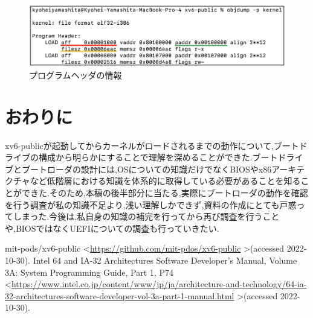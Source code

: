 \documentclass[submit,techreq,noauthor]{eco}	%
\begin{document}
\begin{figure}[H]
    \centering
    \includegraphics[scale=0.4]{fig/pic9.eps}
    \caption{プログラムヘッダの情報}
    \label{sample}
\end{figure}

\section{おわりに}
xv6-publicが起動してからカーネルがロードされるまでの動作について,ブートドライブの構成から明らかにすることで理解を深めることができた.ブートドライブとブートローダの設計には,OSについての知識だけでなくBIOSやx86アーキテクチャなど低階層における知識を体系的に取得している必要があることを知ることができた.そのため,本稿の後半部分に当たる,実際にブートローダの動作を確認を行う調査が私の知識不足より,浅い理解しかできず,資料の作成にとても戸惑ってしまった.今後は,私自身の知識の補完を行ってから再び調査を行うことや,BIOSではなくUEFIについての調査も行っていきたい.


\begin{thebibliography}{99}
mit-pods/xv6-public
\textless\url{https://github.com/mit-pdos/xv6-public}
  \textgreater (accessed 2022-10-30).
Intel 64 and IA-32 Architectures Software Developer’s Manual, Volume 3A: System Programming Guide, Part 1, P74
\textless\url{https://www.intel.co.jp/content/www/jp/ja/architecture-and-technology/64-ia-32-architectures-software-developer-vol-3a-part-1-manual.html}
  \textgreater (accessed 2022-10-30).
\end{thebibliography}
\end{document}
